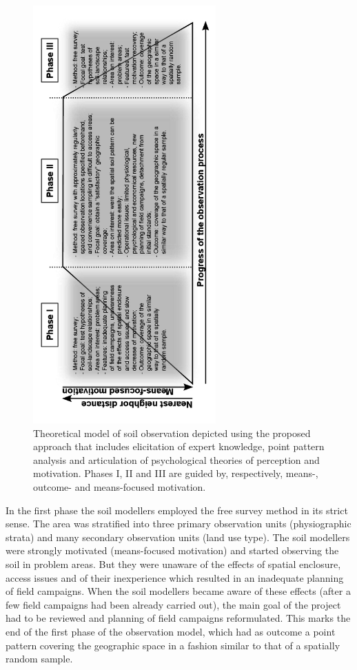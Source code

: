 \begin{figure}[!h]
\centering
\includegraphics[width=70mm, angle=-90]{fig/chap07-observation-model}
 \caption[Theoretical model of soil observation.]{Theoretical model of soil observation depicted using the 
proposed approach that includes elicitation of expert knowledge, point pattern analysis and articulation of 
psychological theories of perception and 
 motivation. Phases I, II and III are guided by, respectively, means-, outcome- and means-focused motivation.}
 \label{fig:chap07-model}
\end{figure}

In the first phase the soil modellers employed the free survey method in its strict sense. The area was 
stratified into three primary observation units (physiographic strata) and many secondary observation units 
(land use type). The soil modellers were strongly motivated (means-focused motivation) and started observing 
the soil in problem areas. But they were unaware of the effects of spatial enclosure, access issues and of 
their inexperience which resulted in an inadequate planning of field campaigns. When the soil modellers became
aware of these effects (after a few field campaigns had been already carried out), the main goal of the 
project had to be reviewed and planning of field campaigns reformulated. This marks the end of the first phase 
of the observation model, which had as outcome a point pattern covering the geographic space in a fashion 
similar to that of a spatially random sample.

